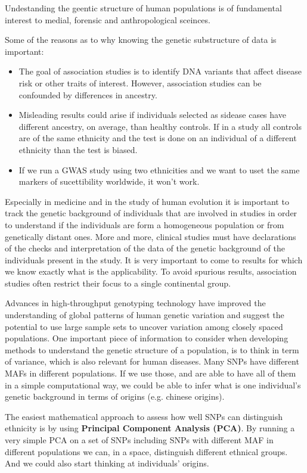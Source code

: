 Undestanding the geentic structure of human populations is of fundamental
interest to medial, forensic and anthropological sceinces. 

Some of the reasons as to why knowing the genetic substructure of data is
important:
\begin{itemize}
	\item The goal of association studies is to identify DNA variants that
	affect disease risk or other traits of interest. However, association
	studies can be confounded by differences in ancestry.
	\item Misleading results could arise if individuals selected as sidease
	cases have different ancestry, on average, than healthy controls. If in a
	study all controls are of the same ethnicity and the test is done on an
	individual of a different ethnicity than the test is biased.
 	\item If we run a GWAS study using two ethnicities and we want to uset the
 	same markers of sucettibility worldwide, it won't work. 
\end{itemize}

Especially in medicine and in the study of human evolution it is important to
track the genetic background of individuals that are involved in studies in
order to understand if the individuals are form a homogeneous population or from
genetically distant ones. More and more, clinical studies must have declarations
of the checks and interpretation of the data of the genetic background of the
individuals present in the study. It is very important to come to results for
which we know exactly what is the applicability. To avoid spurious results,
association studies often restrict their focus to a single continental group. 

Advances in high-throughput genotyping technology have improved the
understanding of global patterns of human genetic variation and suggest the
potential to use large sample sets to uncover variation among closely spaced
populations. One important piece of information to consider when developing
methods to understand the genetic structure of a population, is to think in term
of variance, which is also relevant for human diseases. Many SNPs have different
MAFs in different populations. If we use those, and are able to have all of them
in a simple computational way, we could be able to infer what is one
individual's genetic background in terms of origins (e.g. chinese origins). 

The easiest mathematical approach to assess how well SNPs can distinguish
ethnicity is by using \textbf{Principal Component Analysis (PCA)}. By running a
very simple PCA on a set of SNPs including SNPs with different MAF in different
populations we can, in a space, distinguish different ethnical groups. And we
could also start thinking at individuals' origins. 

